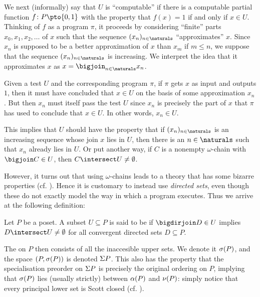We next (informally) say that $U$ is \enquote{computable} if there is a computable partial function $f \colon P \pto \{0,1\}$ with the property that $f(x) = 1$ if and only if $x \in U$. Thinking of $f$ as a program $\pi$, it proceeds by considering \enquote{finite} parts $x_0,x_1,x_2,\ldots$ of $x$ such that the sequence $(x_n)_{n \in \naturals}$ \enquote{approximates} $x$. Since $x_n$ is supposed to be a better approximation of $x$ than $x_m$ if $m \leq n$, we suppose that the sequence $(x_n)_{n \in \naturals}$ is increasing. We interpret the idea that it approximates $x$ as $x = \bigjoin_{n \in \naturals} x_n$.

Given a test $U$ and the corresponding program $\pi$, if $\pi$ gets $x$ as input and outputs $1$, then it must have concluded that $x \in U$ on the basis of some approximation $x_n$. But then $x_n$ must itself pass the test $U$ since $x_n$ is precisely the part of $x$ that $\pi$ has used to conclude that $x \in U$. In other words, $x_n \in U$.%

This implies that $U$ should have the property that if $(x_n)_{n \in \naturals}$ is an increasing sequence whose join $x$ lies in $U$, then there is an $n \in \naturals$ such that $x_n$ already lies in $U$. Or put another way, if $C$ is a nonempty $\omega$-chain with $\bigjoin C \in U$, then $C \intersect U \neq \emptyset$.

However, it turns out that using $\omega$-chains leads to a theory that has some bizarre properties (cf. \cite[§2.2.4]{abramsky-jung-domain-theory}). Hence it is customary to instead use \emph{directed sets}, even though these do not exactly model the way in which a program executes. Thus we arrive at the following definition:

\begin{definition}
    Let $P$ be a poset. A subset $U \subseteq P$ is said to be  if $\bigdirjoin D \in U$ implies $D \intersect U \neq \emptyset$ for all convergent directed sets $D \subseteq P$.
\end{definition}
%
The  on $P$ then consists of all the inaccesible upper sets. We denote it $\sigma(P)$, and the space $(P,\sigma(P))$ is denoted $\Sigma P$. This also has the property that the specialisation preorder on $\Sigma P$ is precisely the original ordering on $P$, implying that $\sigma(P)$ lies (usually strictly) between $\alpha(P)$ and $\nu(P)$: simply notice that every principal lower set is Scott closed (cf. \cite[Proposition~4.2.18]{goubault-larrecq-topology}).




